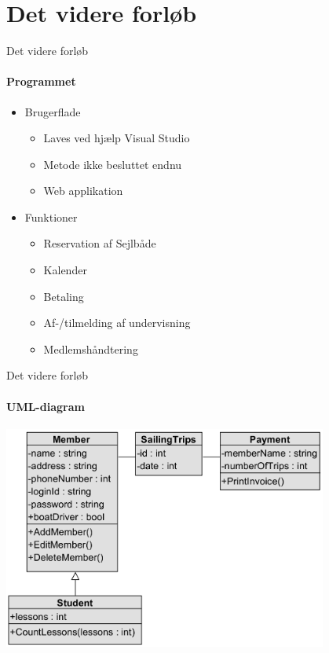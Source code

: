 \section{Det videre forløb}

\begin{frame}{Det videre forløb}
\framesubtitle{Programmet}

	\begin{itemize}
	\item Brugerflade
		\begin{itemize}
		\item Laves ved hjælp Visual Studio
		\item Metode ikke besluttet endnu
		\item Web applikation 
		\end{itemize}
		
	\item Funktioner
		\begin{itemize}
		\item Reservation af Sejlbåde
		\item Kalender
		\item Betaling
		\item Af-/tilmelding af undervisning
		\item Medlemshåndtering
		\end{itemize}	
		
	\end{itemize}

\end{frame}

\begin{frame}{Det videre forløb}
\framesubtitle{UML-diagram}

\includegraphics[width=0.8\textwidth,height=0.8\textheight,keepaspectratio]{images/UML-diagram.png}

\end{frame}